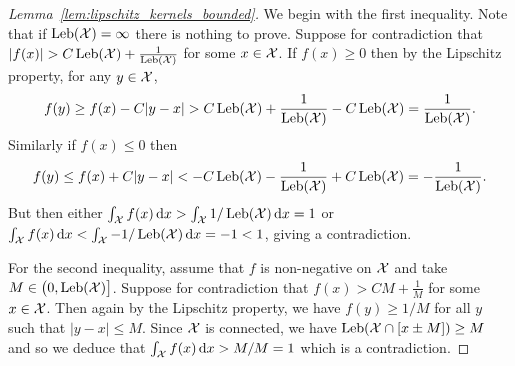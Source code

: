 \begin{proof}[Lemma~\ref{lem:lipschitz_kernels_bounded}]

  We begin with the first inequality.
  Note that if $\operatorname{Leb}(\mathcal{X}) = \infty$ there is nothing to prove.
  Suppose for contradiction that
  $|f(x)| > C \operatorname{Leb}(\mathcal{X}) + \frac{1}{\operatorname{Leb}(\mathcal{X})}$
  for some $x \in \mathcal{X}$.
  If $f(x) \geq 0$
  then by the Lipschitz property, for any $y \in \mathcal{X}$,
  \begin{align*}
    f(y)
    \geq f(x) - C|y-x|
    > C \operatorname{Leb}(\mathcal{X}) + \frac{1}{\operatorname{Leb}(\mathcal{X})} - C\operatorname{Leb}(\mathcal{X})
    = \frac{1}{\operatorname{Leb}(\mathcal{X})}.
  \end{align*}
  Similarly if $f(x) \leq 0$ then
  \begin{align*}
    f(y)
    \leq f(x) + C|y-x|
    < - C \operatorname{Leb}(\mathcal{X}) - \frac{1}{\operatorname{Leb}(\mathcal{X})} + C\operatorname{Leb}(\mathcal{X})
    = -\frac{1}{\operatorname{Leb}(\mathcal{X})}.
  \end{align*}
  But then either
  $\int_{\mathcal{X}} f(x) \,\mathrm{d}x > \int_{\mathcal{X}} 1/\operatorname{Leb}(\mathcal{X}) \,\mathrm{d}x = 1$
  or
  $\int_{\mathcal{X}} f(x) \,\mathrm{d}x < \int_{\mathcal{X}} -1/\operatorname{Leb}(\mathcal{X}) \,\mathrm{d}x = -1 < 1$,
  giving a contradiction.

  For the second inequality,
  assume that $f$ is non-negative on $\mathcal{X}$
  and take $M \in \big(0, \operatorname{Leb}(\mathcal{X})\big]$.
  Suppose for contradiction that
  $f(x) > C M + \frac{1}{M}$
  for some $x \in \mathcal{X}$.
  Then again by the Lipschitz property,
  we have $f(y) \geq 1/M$
  for all $y$ such that $|y - x| \leq M$.
  Since $\mathcal{X}$ is connected, we have
  $\operatorname{Leb}(\mathcal{X} \cap [x \pm M]) \geq M$
  and so we deduce that
  $\int_{\mathcal{X}} f(x) \,\mathrm{d}x > M/M = 1$
  which is a contradiction.
\end{proof}

